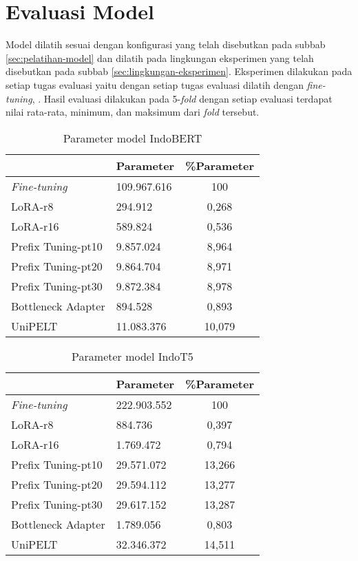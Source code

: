 \section{Evaluasi Model}

Model dilatih sesuai dengan konfigurasi yang telah disebutkan pada subbab \ref{sec:pelatihan-model} dan dilatih pada lingkungan eksperimen yang telah disebutkan pada subbab \ref{sec:lingkungan-eksperimen}. Eksperimen dilakukan pada setiap tugas evaluasi yaitu \nlptask dengan setiap tugas evaluasi dilatih dengan \textit{fine-tuning}, \methodPEFT. Hasil evaluasi dilakukan pada 5-\textit{fold} dengan setiap evaluasi terdapat nilai rata-rata, minimum, dan maksimum dari \textit{fold} tersebut.

\begin{table}[h]
    \centering
    \caption{Parameter model IndoBERT}
    \label{table:param-indobert}
    \begin{tabular}{|l|l|c|}
        \hline \rowcolor{black!10}
        \multicolumn{1}{|c|}{\textbf{Metode}} & \multicolumn{1}{|c|}{\textbf{Parameter}} & \textbf{\%Parameter} \\ \hline
        \textit{Fine-tuning} & 109.967.616 &  100 \\ \hline
        LoRA-r8 & 294.912 & 0,268 \\ \hline
        LoRA-r16 & 589.824 & 0,536 \\ \hline
        Prefix Tuning-pt10 & 9.857.024 & 8,964 \\ \hline
        Prefix Tuning-pt20 & 9.864.704 & 8,971 \\ \hline
        Prefix Tuning-pt30 & 9.872.384 & 8,978 \\ \hline
        Bottleneck Adapter & 894.528 & 0,893 \\ \hline
        UniPELT & 11.083.376 & 10,079 \\ \hline
    \end{tabular}
\end{table}

\begin{table}[h]
    \centering
    \caption{Parameter model IndoT5}
    \label{table:param-indot5}
    \begin{tabular}{|l|l|c|}
        \hline \rowcolor{black!10}
        \multicolumn{1}{|c|}{\textbf{Metode}} & \multicolumn{1}{|c|}{\textbf{Parameter}} & \textbf{\%Parameter} \\ \hline
        \textit{Fine-tuning} & 222.903.552 &  100 \\ \hline
        LoRA-r8 & 884.736 & 0,397 \\ \hline
        LoRA-r16 & 1.769.472 & 0,794 \\ \hline
        Prefix Tuning-pt10 & 29.571.072 & 13,266 \\ \hline
        Prefix Tuning-pt20 & 29.594.112 & 13,277 \\ \hline
        Prefix Tuning-pt30 & 29.617.152 & 13,287 \\ \hline
        Bottleneck Adapter & 1.789.056 & 0,803 \\ \hline
        UniPELT & 32.346.372 & 14,511 \\ \hline
    \end{tabular}
\end{table}


